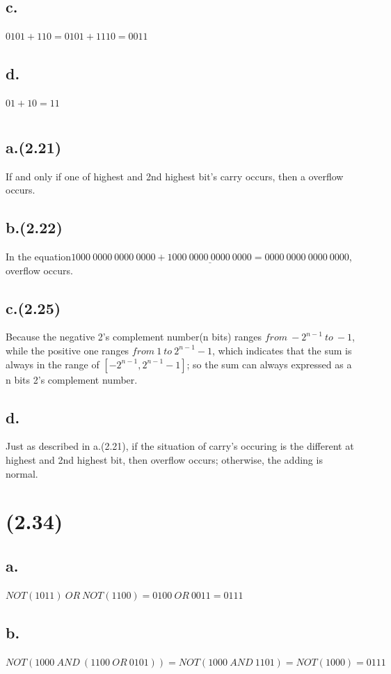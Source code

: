\documentclass[11pt,a4paper]{article}
\begin{document}
	\subsection*{c.}
	$0101+110=0101+1110=0011$
	\subsection*{d.}
	$01+10=11$
	
	
	\section{}
	\subsection*{a.(2.21)}
	If and only if one of highest and 2nd highest bit's carry occurs, then a overflow occurs.
	\subsection*{b.(2.22)}
	In the equation$\underline{1000\ 0000\ 0000\ 0000+1000\ 0000\ 0000\ 0000=0000\ 0000\ 0000\ 0000}$, overflow occurs.
	\subsection*{c.(2.25)}
	Because the negative 2's complement number(n bits) ranges $from\ -2^{n-1}\ to\  -1$, while the positive one ranges $from\ 1\ to\ 2^{n-1}-1$, which indicates that the sum is always in the range of $[-2^{n-1}, 2^{n-1}-1]$; so the sum can always expressed as a n bits 2's complement number.
	\subsection*{d.}
	Just as described in a.(2.21), if the situation of carry's occuring is the different at highest and 2nd highest bit, then overflow occurs; otherwise, the adding is normal.
	
	
	\section{(2.34)}
	\subsection*{a.}
	$NOT(1011)\ OR\ NOT(1100)=0100\ OR\ 0011=0111$
	\subsection*{b.}
	$NOT(1000\ AND\ (1100\ OR\ 0101))=NOT(1000\ AND\ 1101)=NOT(1000)=0111$
\end{document}
